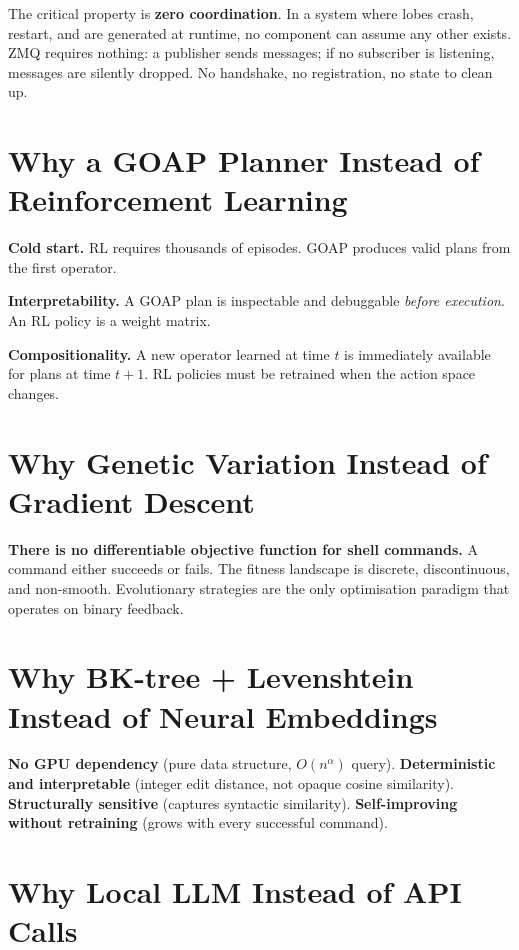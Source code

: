 \documentclass[12pt,a4paper]{report}
\begin{document}
The critical property is \textbf{zero coordination}. In a system where lobes crash, restart, and are generated at runtime, no component can assume any other exists. ZMQ requires nothing: a publisher sends messages; if no subscriber is listening, messages are silently dropped. No handshake, no registration, no state to clean up.

\section{Why a GOAP Planner Instead of Reinforcement Learning}

\textbf{Cold start.} RL requires thousands of episodes. GOAP produces valid plans from the first operator.

\textbf{Interpretability.} A GOAP plan is inspectable and debuggable \emph{before execution}. An RL policy is a weight matrix.

\textbf{Compositionality.} A new operator learned at time $t$ is immediately available for plans at time $t+1$. RL policies must be retrained when the action space changes.

\section{Why Genetic Variation Instead of Gradient Descent}

\textbf{There is no differentiable objective function for shell commands.} A command either succeeds or fails. The fitness landscape is discrete, discontinuous, and non-smooth. Evolutionary strategies are the only optimisation paradigm that operates on binary feedback.

\section{Why BK-tree + Levenshtein Instead of Neural Embeddings}

\textbf{No GPU dependency} (pure data structure, $O(n^{\alpha})$ query). \textbf{Deterministic and interpretable} (integer edit distance, not opaque cosine similarity). \textbf{Structurally sensitive} (captures syntactic similarity). \textbf{Self-improving without retraining} (grows with every successful command).

\section{Why Local LLM Instead of API Calls}
\end{document}
